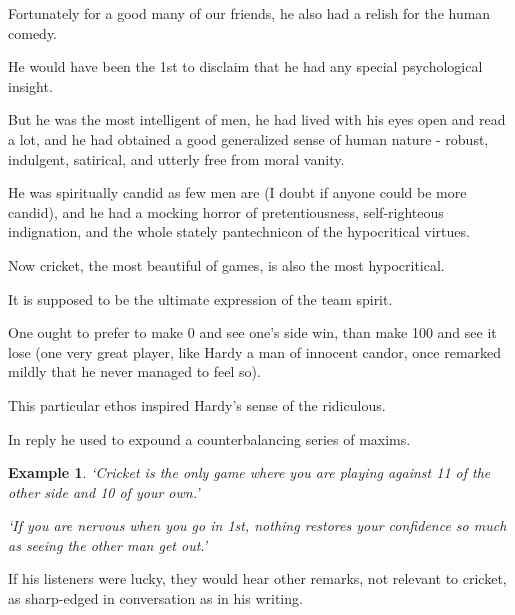 \documentclass{article}
\numberwithin{equation}{section}
\newtheorem{example}{Example}
\begin{document}
Fortunately for a good many of our friends, he also had a relish for the human comedy.

%
He would have been the 1st to disclaim that he had any special psychological insight.

But he was the most intelligent of men, he had lived with his eyes open and read a lot, and he had obtained a good generalized sense of human nature - robust, indulgent, satirical, and utterly free from moral vanity.

He was spiritually candid as few men are (I doubt if anyone could be more candid), and he had a mocking horror of pretentiousness, self-righteous indignation, and the whole stately pantechnicon of the hypocritical virtues.

Now cricket, the most beautiful of games, is also the most hypocritical.

It is supposed to be the ultimate expression of the team spirit.

One ought to prefer to make 0 and see one's side win, than make 100 and see it lose (one very great player, like Hardy a man of innocent candor, once remarked mildly that he never managed to feel so).

This particular ethos inspired Hardy's sense of the ridiculous.

In reply he used to expound a counterbalancing series of maxims.
\begin{example}
    `Cricket is the only game where you are playing against 11 of the other side and 10 of your own.'
    
    `If you are nervous when you go in 1st, nothing restores your confidence so much as seeing the other man get out.'
\end{example}
If his listeners were lucky, they would hear other remarks, not relevant to cricket, as sharp-edged in conversation as in his writing.
\end{document}
